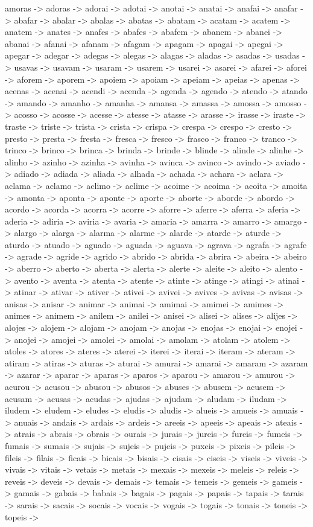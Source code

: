 \documentclass[a4paper,11pt]{article}
\begin{document}
amoras -> adoras -> adorai -> adotai -> anotai -> anatai -> anafai -> anafar -> abafar -> abalar -> abalas -> abatas -> abatam -> acatam -> acatem -> anatem -> anates -> anafes -> abafes -> abafem -> abanem -> abanei -> abanai -> afanai -> afanam -> afagam -> apagam -> apagai -> apegai -> apegar -> adegar -> adegas -> alegas -> alagas -> aladas -> asadas -> usadas -> usavas -> usavam -> usaram -> usarem -> usarei -> asarei -> afarei -> aforei -> aforem -> aporem -> apoiem -> apoiam -> apeiam -> apeias -> apenas -> acenas -> acenai -> acendi -> acenda -> agenda -> agendo -> atendo -> atando -> amando -> amanho -> amanha -> amansa -> amassa -> amossa -> amosso -> acosso -> acosse -> acesse -> atesse -> atasse -> arasse -> irasse -> iraste -> traste -> triste -> trista -> crista -> crispa -> crespa -> crespo -> cresto -> presto -> presta -> fresta -> fresca -> fresco -> frasco -> franco -> tranco -> trinco -> brinco -> brinca -> brinda -> brinde -> blinde -> alinde -> alinhe -> alinho -> azinho -> azinha -> avinha -> avinca -> avinco -> avindo -> aviado -> adiado -> adiada -> aliada -> alhada -> achada -> achara -> aclara -> aclama -> aclamo -> aclimo -> aclime -> acoime -> acoima -> acoita -> amoita -> amonta -> aponta -> aponte -> aporte -> aborte -> aborde -> abordo -> acordo -> acorda -> acorra -> acorre -> aforre -> aferre -> aferra -> aferia -> aderia -> adiria -> aviria -> avaria -> amaria -> amarra -> amarro -> amargo -> alargo -> alarga -> alarma -> alarme -> alarde -> atarde -> aturde -> aturdo -> atuado -> aguado -> aguada -> aguava -> agrava -> agrafa -> agrafe -> agrade -> agride -> agrido -> abrido -> abrida -> abrira -> abeira -> abeiro -> aberro -> aberto -> aberta -> alerta -> alerte -> aleite -> aleito -> alento -> avento -> aventa -> atenta -> atente -> atinte -> atinge -> atingi -> atinai -> atinar -> ativar -> ativer -> ativei -> avivei -> avives -> avivas -> avisas -> anisas -> anisar -> animar -> animai -> amimai -> amimei -> amimes -> animes -> animem -> anilem -> anilei -> anisei -> alisei -> alises -> alijes -> alojes -> alojem -> alojam -> anojam -> anojas -> enojas -> enojai -> enojei -> anojei -> amojei -> amolei -> amolai -> amolam -> atolam -> atolem -> atoles -> atores -> ateres -> aterei -> iterei -> iterai -> iteram -> ateram -> atiram -> atiras -> aturas -> aturai -> amurai -> amarai -> amaram -> azaram -> azarar -> aparar -> aparas -> aparos -> aparou -> amarou -> amurou -> acurou -> acusou -> abusou -> abusos -> abuses -> abusem -> acusem -> acusam -> acusas -> acudas -> ajudas -> ajudam -> aludam -> iludam -> iludem -> eludem -> eludes -> eludis -> aludis -> alueis -> amueis -> amuais -> anuais -> andais -> ardais -> ardeis -> areeis -> apeeis -> apeais -> ateais -> atrais -> abrais -> obrais -> ourais -> jurais -> jureis -> fureis -> fumeis -> fumais -> sumais -> sujais -> sujeis -> pujeis -> puxeis -> pixeis -> pileis -> fileis -> filais -> ficais -> bicais -> bisais -> cisais -> ciseis -> viseis -> viveis -> vivais -> vitais -> vetais -> metais -> mexais -> mexeis -> meleis -> releis -> reveis -> deveis -> devais -> demais -> temais -> temeis -> gemeis -> gameis -> gamais -> gabais -> babais -> bagais -> pagais -> papais -> tapais -> tarais -> sarais -> sacais -> socais -> vocais -> vogais -> togais -> tonais -> toneis -> topeis -> 
\end{document}
